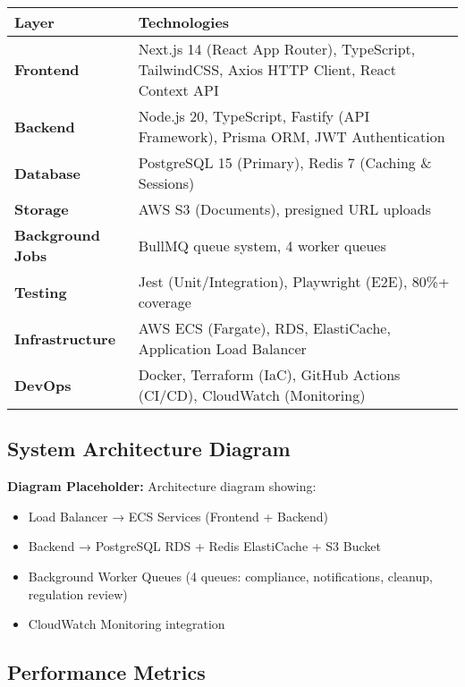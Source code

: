 \documentclass[11pt,a4paper]{article}
\begin{document}
\begin{table}[H]
\centering
\begin{tabular}{p{4cm}p{10cm}}
\toprule
\textbf{Layer} & \textbf{Technologies} \\
\midrule
\textbf{Frontend} &
    Next.js 14 (React App Router), TypeScript, TailwindCSS, Axios HTTP Client, React Context API \\[0.3cm]
\textbf{Backend} &
    Node.js 20, TypeScript, Fastify (API Framework), Prisma ORM, JWT Authentication \\[0.3cm]
\textbf{Database} &
    PostgreSQL 15 (Primary), Redis 7 (Caching \& Sessions) \\[0.3cm]
\textbf{Storage} &
    AWS S3 (Documents), presigned URL uploads \\[0.3cm]
\textbf{Background Jobs} &
    BullMQ queue system, 4 worker queues \\[0.3cm]
\textbf{Testing} &
    Jest (Unit/Integration), Playwright (E2E), 80\%+ coverage \\[0.3cm]
\textbf{Infrastructure} &
    AWS ECS (Fargate), RDS, ElastiCache, Application Load Balancer \\[0.3cm]
\textbf{DevOps} &
    Docker, Terraform (IaC), GitHub Actions (CI/CD), CloudWatch (Monitoring) \\
\bottomrule
\end{tabular}
\end{table}

\subsection{System Architecture Diagram}

\textbf{Diagram Placeholder:} Architecture diagram showing:
\begin{itemize}
    \item Load Balancer → ECS Services (Frontend + Backend)
    \item Backend → PostgreSQL RDS + Redis ElastiCache + S3 Bucket
    \item Background Worker Queues (4 queues: compliance, notifications, cleanup, regulation review)
    \item CloudWatch Monitoring integration
\end{itemize}

\subsection{Performance Metrics}
\end{document}
